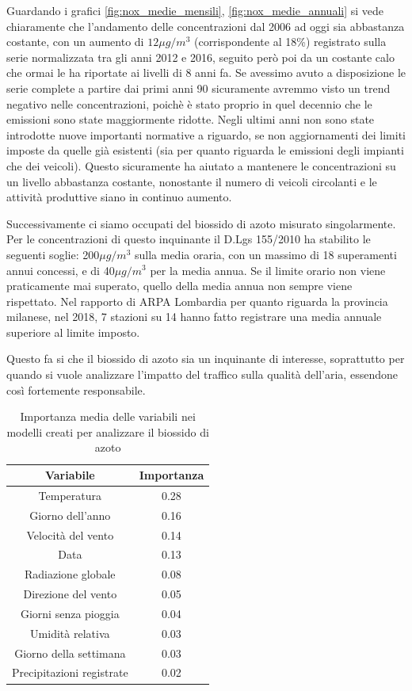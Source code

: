 \documentclass[a4paper,12pt]{report}
\begin{document}
Guardando
i grafici \ref{fig:nox_medie_mensili}, \ref{fig:nox_medie_annuali} si vede chiaramente che l'andamento delle concentrazioni dal 2006 ad oggi sia abbastanza costante, con un aumento di $12\mu g/m^3$ (corrispondente al 18\%) registrato sulla serie normalizzata tra gli anni 2012 e 2016, seguito però poi da un costante calo che ormai le ha riportate ai livelli di 8 anni fa. Se avessimo avuto a disposizione le serie complete a partire dai primi anni 90 sicuramente avremmo visto un trend negativo nelle concentrazioni, poichè è stato proprio in quel decennio che le emissioni sono state maggiormente ridotte. Negli ultimi anni non sono state introdotte nuove importanti normative a riguardo, se non aggiornamenti dei limiti imposte da quelle già esistenti (sia per quanto riguarda le emissioni degli impianti che dei veicoli). Questo sicuramente ha aiutato a mantenere le concentrazioni su un livello abbastanza costante, nonostante il numero di veicoli circolanti e le attività produttive siano in continuo aumento.

Successivamente ci siamo occupati del biossido di azoto misurato singolarmente. Per le concentrazioni di questo inquinante il D.Lgs 155/2010 ha stabilito le seguenti soglie: 200$\mu g/m^3$ sulla media oraria, con un massimo di 18 superamenti annui concessi, e di 40$\mu g/m^3$ per la media annua. Se il limite orario non viene praticamente mai superato, quello della media annua non sempre viene rispettato. Nel rapporto di ARPA Lombardia \cite{arpa2018rapporto} per quanto riguarda la provincia milanese, nel 2018, 7 stazioni su 14 hanno fatto registrare una media annuale superiore al limite imposto.

Questo fa si che il biossido di azoto sia un inquinante di interesse, soprattutto per quando si vuole analizzare l'impatto del traffico sulla qualità dell'aria, essendone così fortemente responsabile.

\begin{table}[h!]
\centering
\begin{tabular}{ |c c| }
	\hline
	Variabile & Importanza \\
	\hline
	Temperatura & 0.28 \\
	Giorno dell'anno & 0.16 \\
	Velocità del vento & 0.14 \\
	Data & 0.13 \\
	Radiazione globale & 0.08 \\
	Direzione del vento & 0.05 \\
	Giorni senza pioggia & 0.04 \\
	Umidità relativa & 0.03 \\
	Giorno della settimana & 0.03 \\
	Precipitazioni registrate & 0.02 \\
	\hline
\end{tabular}
\caption{Importanza media delle variabili nei modelli creati per analizzare il biossido di azoto}
\label{table:importanza_no2}
\end{table}
\end{document}
